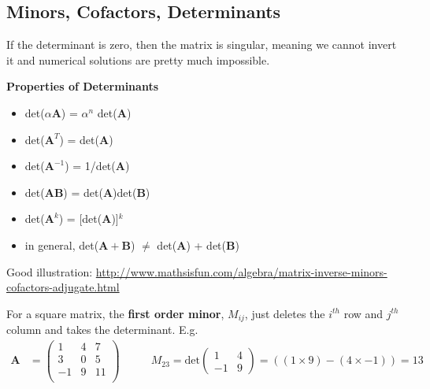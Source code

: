 \documentclass[12pt]{article}
\newcommand{\ve}[1]{\ensuremath{\mathbf{#1}}}
\begin{document}
\subsection{Minors, Cofactors, Determinants}


If the determinant is zero, then the matrix is singular, meaning we cannot invert it and numerical solutions are pretty much impossible.

\textbf{Properties of Determinants}
\begin{itemize}
\item det($\alpha\ve{A}$) = $\alpha^n$ det($\ve{A}$)

\item det($\ve{A}^T$) = det($\ve{A}$)

\item det($\ve{A}^{-1}$) = 1/det($\ve{A}$)

\item det($\ve{AB}$) = det($\ve{A}$)det($\ve{B}$)

\item det($\ve{A}^k$) = [det($\ve{A}$)]$^k$

\item in general, det($\ve{A + B}$) $\neq$ det($\ve{A}$) + det($\ve{B}$) 
\end{itemize}

Good illustration: \href{http://www.mathsisfun.com/algebra/matrix-inverse-minors-cofactors-adjugate.html}{http://www.mathsisfun.com/algebra/matrix-inverse-minors-cofactors-adjugate.html}


For a square matrix, the \textbf{first order minor}, $M_{ij}$, just deletes the $i^{th}$ row and $j^{th}$ column and takes the determinant. E.g.
%
\begin{align}
    \ve{A} &= \begin{pmatrix}
        1 & 4 & 7 \\
        3 & 0 & 5 \\
        -1 & 9 & 11 \\
    \end{pmatrix} 
    \qquad
    &M_{23} = \text{det}\begin{pmatrix}
       1 & 4 \\
       -1 & 9 
    \end{pmatrix}   
    = ((1 \times 9) - (4 \times -1)) = 13 \nonumber
\end{align} 
\end{document}
